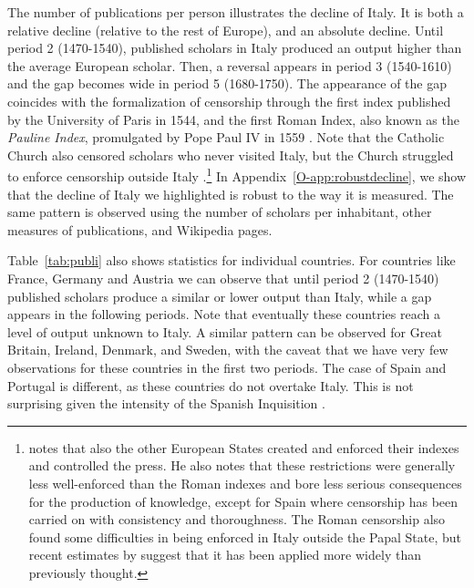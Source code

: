 The number of publications per person illustrates the decline of Italy. It is both a relative decline (relative to the rest of Europe), and an absolute decline. Until period 2 (1470-1540), published scholars in Italy produced an output higher than the average European scholar. Then, a reversal appears in period 3 (1540-1610) and the gap becomes  wide in period 5 (1680-1750). The appearance of the gap coincides with the
formalization of censorship through the first index published by the University of Paris in 1544, and the first Roman Index, also known as the {\em Pauline Index}, promulgated by Pope Paul IV in 1559 \cite{de2002index}. Note that the Catholic Church also censored scholars who never visited Italy, but the Church struggled to enforce censorship outside Italy \cite{putnam1906}.\footnote{ notes that also the other European States created and enforced their indexes and controlled the press. He also notes that these restrictions were generally less well-enforced than the Roman indexes and bore less serious consequences for the production of knowledge, except for Spain where censorship has been carried on with consistency and thoroughness. The Roman censorship also found some difficulties in being enforced in Italy outside the Papal State, but recent estimates by  suggest that it has been applied more widely than previously thought. }
In Appendix~\ref{O-app:robustdecline}, we show that the decline of Italy we highlighted is robust to the way it is measured. The same pattern is observed using the number of scholars per inhabitant, other measures of publications, and Wikipedia pages.

Table~\ref{tab:publi} also shows statistics for  individual countries. %
 For countries like France, Germany and Austria we can observe that until period 2 (1470-1540) published scholars produce a similar or lower output than Italy, while a gap appears in the following periods. Note that eventually these countries reach a level of output unknown to Italy. A similar pattern can be observed for Great Britain, Ireland, Denmark, and Sweden, with the caveat that we have very few observations for these countries in the first two periods. The case of Spain and Portugal is different, as these countries do not overtake Italy. This is not surprising given the intensity of the Spanish Inquisition \cite{vidal2011}.


